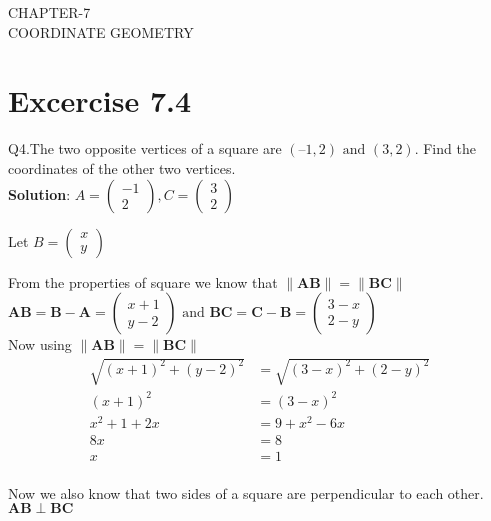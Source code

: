 \documentclass[12pt]{article}
\let\vec\mathbf
\begin{document}
\begin{center}
\textbf\large{CHAPTER-7 \\ COORDINATE GEOMETRY}

\end{center}
\section*{Excercise 7.4}

Q4.The two opposite vertices of a square are $(–1, 2) \text{ and } (3, 2)$. Find the coordinates of the other two vertices.\\

\textbf{Solution}: $A =
\begin{pmatrix}
-1 \\
 2
\end{pmatrix},
C = 
\begin{pmatrix}
3\\
2
\end{pmatrix}$

Let $B = \begin{pmatrix}
x\\
y
\end{pmatrix}$

From the properties of square we know that
 $\lVert \vec{AB} \rVert = \lVert \vec{BC} \rVert$\\
 
 $\vec{AB} = \vec{B} - \vec{A} = \begin{pmatrix}
x+1 \\
 y-2
\end{pmatrix} \text{ and }
\vec{BC} = \vec{C} - \vec{B} = \begin{pmatrix}
3-x \\
 2-y
\end{pmatrix}$\\

Now using $\lVert \vec{AB} \rVert = \lVert \vec{BC} \rVert$\\
\begin{align}
\sqrt{(x+1)^{2} + (y-2)^{2}} &= \sqrt{(3-x)^{2} + (2-y)^{2}} \\
(x+1)^{2} &= (3-x)^{2}\\
x^{2}+1+2x &= 9+x^{2}-6x\\
8x &= 8\\
x &= 1
\end{align}\\
Now we also know that two sides of a square are perpendicular to each other.\\
$\vec{AB} \perp \vec{BC}$
\end{document}

